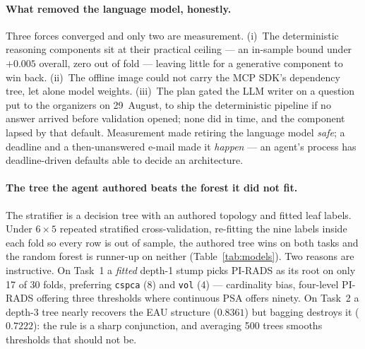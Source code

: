 \documentclass[runningheads]{llncs}
\newcommand{\code}[1]{\texttt{\small #1}}
\begin{document}
\paragraph{What removed the language model, honestly.}
Three forces converged and only two are measurement. (i)~The deterministic reasoning
components sit at their practical ceiling --- an in-sample bound under $+0.005$
overall, zero out of fold --- leaving little for a generative component to win back.
(ii)~The offline image could not carry the MCP SDK's dependency tree, let alone model
weights. (iii)~The plan gated the LLM writer on a question put to the organizers on
29~August, to ship the deterministic pipeline if no answer arrived before validation
opened; none did in time, and the component lapsed by that default. Measurement made
retiring the language model \emph{safe}; a deadline and a then-unanswered e-mail made
it \emph{happen} --- an agent's process has deadline-driven defaults able to decide an
architecture.

\paragraph{The tree the agent authored beats the forest it did not fit.}
The stratifier is a decision tree with an authored topology and fitted leaf labels.
Under $6\times5$ repeated stratified cross-validation, re-fitting the nine labels
inside each fold so every row is out of sample, the authored tree wins on both tasks
and the random forest is runner-up on neither (Table~\ref{tab:models}). Two reasons
are instructive. On Task~1 a \emph{fitted} depth-1 stump picks PI-RADS as its root on
only 17 of 30 folds, preferring \code{cspca} (8) and \code{vol} (4) --- cardinality
bias, four-level PI-RADS offering three thresholds where continuous PSA offers ninety.
On Task~2 a depth-3 tree nearly recovers the EAU structure ($0.8361$) but bagging
destroys it ($0.7222$): the rule is a sharp conjunction, and averaging 500 trees
smooths thresholds that should not be.
\end{document}

